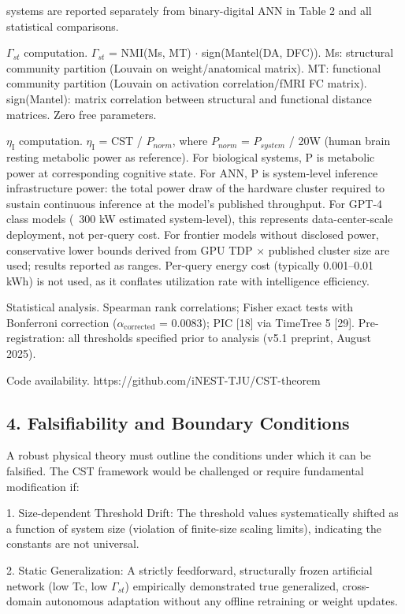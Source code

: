 \documentclass[a4paper,12pt]{article}
\begin{document}
\dagNMH systems are reported separately from binary-digital ANN in Table 2 and all statistical comparisons.


$\Gamma_{st}$ computation. $\Gamma_{st}$ = NMI(Ms, MT) $\cdot$ sign(Mantel(DA, DFC)). Ms: structural community partition (Louvain on weight/anatomical matrix). MT: functional community partition (Louvain on activation correlation/fMRI FC matrix). sign(Mantel): matrix correlation between structural and functional distance matrices. Zero free parameters.


$\eta_{\text{I}}$ computation. $\eta_{\text{I}}$ = CST / $P_{norm}$, where $P_{norm}$ = $P_{system}$ / 20W (human brain resting metabolic power as reference).
For biological systems, P is metabolic power at corresponding cognitive state.
For ANN, P is system-level inference infrastructure power: the total power draw of the hardware cluster required to sustain continuous inference at the model's published throughput.
For GPT-4 class models (~300 kW estimated system-level), this represents data-center-scale deployment, not per-query cost.
For frontier models without disclosed power, conservative lower bounds derived from GPU TDP $\times$ published cluster size are used; results reported as ranges.
Per-query energy cost (typically 0.001--0.01 kWh) is not used, as it conflates utilization rate with intelligence efficiency.


Statistical analysis. Spearman rank correlations; Fisher exact tests with Bonferroni correction ($\alpha_{\text{corrected}}$ = 0.0083); PIC [18] via TimeTree 5 [29]. Pre-registration: all thresholds specified prior to analysis (v5.1 preprint, August 2025).


Code availability. https://github.com/iNEST-TJU/CST-theorem



\subsection{4. Falsifiability and Boundary Conditions}

A robust physical theory must outline the conditions under which it can be falsified. The CST framework would be challenged or require fundamental modification if:


1. Size-dependent Threshold Drift: The threshold values systematically shifted as a function of system size (violation of finite-size scaling limits), indicating the constants are not universal.


2. Static Generalization: A strictly feedforward, structurally frozen artificial network (low Tc, low $\Gamma_{st}$) empirically demonstrated true generalized, cross-domain autonomous adaptation without any offline retraining or weight updates.
\end{document}
